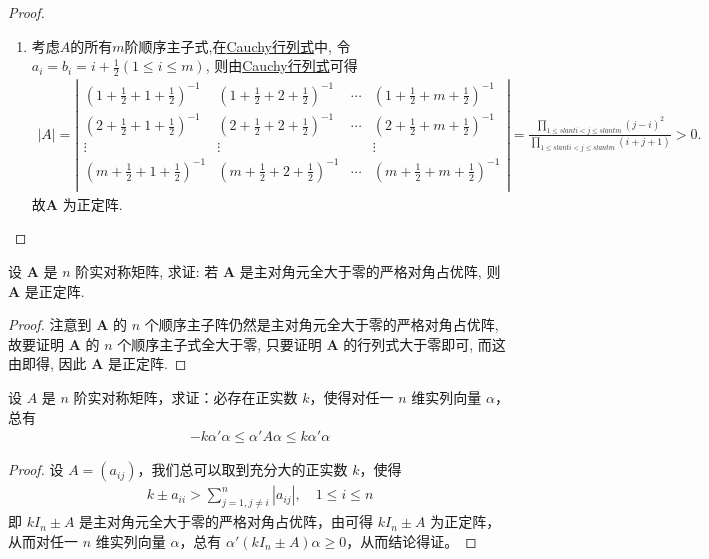 \documentclass[../../main.tex]{subfiles}
\begin{document}
\begin{proof}
\begin{enumerate}[(1)]
\item 考虑$A$的所有$m$阶顺序主子式,在\hyperref[Cauchy行列式]{Cauchy行列式}中, 令 \(a_i = b_i = i+\frac{1}{2}(1\leqslant  i\leqslant  m)\), 则由\hyperref[Cauchy行列式]{Cauchy行列式}可得
\begin{align*}
|A|=\left| \begin{matrix}
(1+\frac{1}{2}+1+\frac{1}{2})^{-1}&		(1+\frac{1}{2}+2+\frac{1}{2})^{-1}&		\cdots&		(1+\frac{1}{2}+m+\frac{1}{2})^{-1}\\
(2+\frac{1}{2}+1+\frac{1}{2})^{-1}&		(2+\frac{1}{2}+2+\frac{1}{2})^{-1}&		\cdots&		(2+\frac{1}{2}+m+\frac{1}{2})^{-1}\\
\vdots&		\vdots&		&		\vdots\\
(m+\frac{1}{2}+1+\frac{1}{2})^{-1}&		(m+\frac{1}{2}+2+\frac{1}{2})^{-1}&		\cdots&		(m+\frac{1}{2}+m+\frac{1}{2})^{-1}\\
\end{matrix} \right|=\frac{\prod\limits_{1\leqslant slant i<j\leqslant slant m}{\left( j-i \right) ^2}}{\prod\limits_{1\leqslant slant i<j\leqslant slant m}{\left( i+j+1 \right)}}>0.
\end{align*}
故\(\boldsymbol{A}\) 为正定阵.
\end{enumerate} 
\end{proof}

\begin{proposition}\label{proposition:主对角元全大于零的严格对角占优阵必正定}
设 \(\boldsymbol{A}\) 是 \(n\) 阶实对称矩阵, 求证: 若 \(\boldsymbol{A}\) 是主对角元全大于零的严格对角占优阵, 则 \(\boldsymbol{A}\) 是正定阵.
\end{proposition}
\begin{proof}
注意到 \(\boldsymbol{A}\) 的 \(n\) 个顺序主子阵仍然是主对角元全大于零的严格对角占优阵, 故要证明 \(\boldsymbol{A}\) 的 \(n\) 个顺序主子式全大于零, 只要证明 \(\boldsymbol{A}\) 的行列式大于零即可, 而这由即得, 因此 \(\boldsymbol{A}\) 是正定阵. 
\end{proof}

\begin{proposition}\label{proposition:例8.50}
设 \(A\) 是 \(n\) 阶实对称矩阵，求证：必存在正实数 \(k\)，使得对任一 \(n\) 维实列向量 \(\alpha\)，总有
\begin{align*}
-k\alpha'\alpha \leqslant  \alpha'A\alpha \leqslant  k\alpha'\alpha
\end{align*}
\end{proposition}
\begin{proof}
设 \(A = (a_{ij})\)，我们总可以取到充分大的正实数 \(k\)，使得
\begin{align*}
k \pm a_{ii} > \sum_{j = 1,j\neq i}^{n}|a_{ij}|,\quad 1\leqslant  i \leqslant  n
\end{align*}
即 \(kI_n \pm A\) 是主对角元全大于零的严格对角占优阵，由可得 \(kI_n \pm A\) 为正定阵，从而对任一 \(n\) 维实列向量 \(\alpha\)，总有 \(\alpha'(kI_n \pm A)\alpha \geqslant  0\)，从而结论得证。 
\end{proof}
\end{document}
